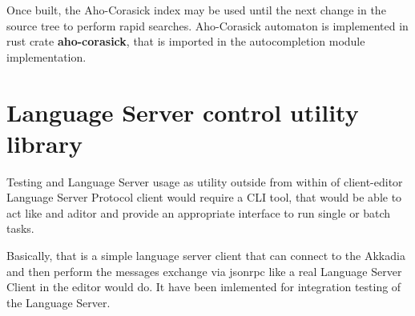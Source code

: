 Once built, the Aho-Corasick index may be used until the next change in the source tree to perform
rapid searches.
Aho-Corasick automaton is implemented in rust crate \textbf{aho-corasick}, that is imported in
the autocompletion module implementation.

\section{Language Server control utility\\ library}
\label{sec:impl:ls_control_api}
Testing and Language Server usage as utility outside from within of client-editor Language Server Protocol client would require
a CLI tool, that would be able to act like and aditor and provide an appropriate interface to run single or batch tasks.

Basically, that is a simple language server client that can connect to the Akkadia and then perform the messages exchange via jsonrpc
like a real Language Server Client in the editor would do.
It have been imlemented for integration testing of the Language Server.